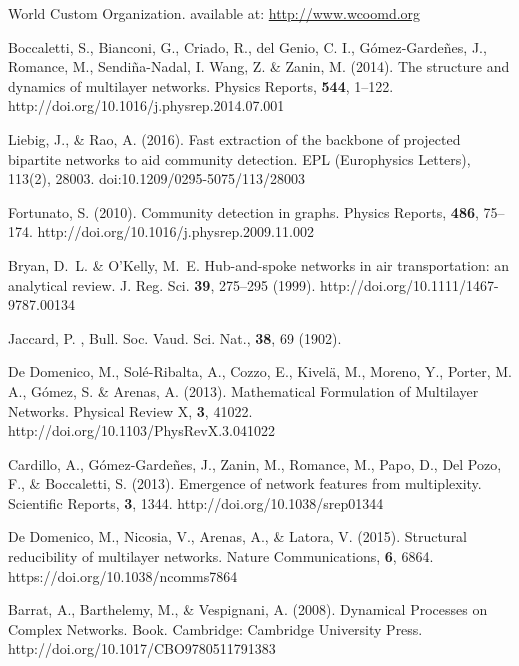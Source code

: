 \documentclass[aps,twocolumn,superscriptaddress]{revtex4-1}
\begin{document}
\begin{thebibliography}{99}
 World Custom Organization. available at: \url{http://www.wcoomd.org}

 Boccaletti, S., Bianconi, G., Criado, R., del Genio, C. I., G\'omez-Garde\~nes, J., Romance, M., Sendi\~na-Nadal, I. Wang, Z. \& Zanin, M. (2014). The structure and dynamics of multilayer networks. Physics Reports, {\bf 544}, 1--122. http://doi.org/10.1016/j.physrep.2014.07.001


 Liebig, J., \& Rao, A. (2016). Fast extraction of the backbone of projected bipartite networks to aid community detection. EPL (Europhysics Letters), 113(2), 28003. doi:10.1209/0295-5075/113/28003


 Fortunato, S. (2010). Community detection in graphs. Physics Reports, {\bf 486}, 75--174. http://doi.org/10.1016/j.physrep.2009.11.002 

 Bryan, D.~L. \& O'Kelly, M.~E. Hub-and-spoke networks in air transportation: an analytical review. J. Reg. Sci. {\bf 39}, 275--295 (1999). http://doi.org/10.1111/1467-9787.00134



 Jaccard, P. , Bull. Soc. Vaud. Sci. Nat., {\bf 38}, 69 (1902).




 De Domenico, M., Sol\'e-Ribalta, A., Cozzo, E., Kivel\"a, M., Moreno, Y., Porter, M. A., G\'omez, S. \& Arenas, A. (2013). Mathematical Formulation of Multilayer Networks. Physical Review X, {\bf 3}, 41022. http://doi.org/10.1103/PhysRevX.3.041022

 Cardillo, A., G\'omez-Garde\~nes, J., Zanin, M., Romance, M., Papo, D., Del Pozo, F., \& Boccaletti, S. (2013). Emergence of network features from multiplexity. Scientific Reports, {\bf 3}, 1344. http://doi.org/10.1038/srep01344

 De Domenico, M., Nicosia, V., Arenas, A., \& Latora, V. (2015). Structural reducibility of multilayer networks. Nature Communications, {\bf 6}, 6864.
https://doi.org/10.1038/ncomms7864




 Barrat, A., Barthelemy, M., \& Vespignani, A. (2008). Dynamical Processes on Complex Networks. Book. Cambridge: Cambridge University Press. http://doi.org/10.1017/CBO9780511791383



\end{thebibliography}
\end{document}
